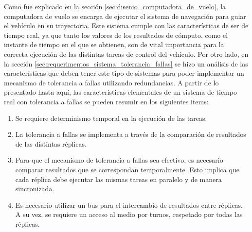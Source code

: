 
Como fue explicado en la sección \ref{sec:disenio_computadora_de_vuelo}, la computadora de vuelo se encarga de ejecutar el sistema de navegación para guiar el vehículo en su trayectoria. Este sistema cumple con las características de ser de tiempo real, ya que tanto los valores de los resultados de cómputo, como el instante de tiempo en el que se obtienen, son de vital importancia para la correcta ejecución de las distintas tareas de control del vehículo. 
Por otro lado, en la sección \ref{sec:requerimentos_sistema_tolerancia_fallas} se hizo un análisis de las características que deben tener este tipo de sistemas para poder implementar un mecanismo de tolerancia a fallas utilizando redundancias. A partir de lo presentado hasta aquí, las características elementales de un sistema de tiempo real con tolerancia a fallas se pueden resumir en los siguientes items:


\begin{enumerate}
    \item Se requiere determinismo temporal en la ejecución de las tareas.
    \item La tolerancia a fallas se implementa a través de la comparación de resultados de las distintas réplicas.
    \item Para que el mecanismo de tolerancia a fallas sea efectivo, es necesario comparar resultados que se correspondan temporalmente. Esto implica que cada réplica debe ejecutar las mismas tareas en paralelo y de manera sincronizada.
    \item Es necesario utilizar un bus para el intercambio de resultados entre réplicas. A su vez, se requiere un acceso al medio por turnos, respetado por todas las réplicas.
\end{enumerate}

